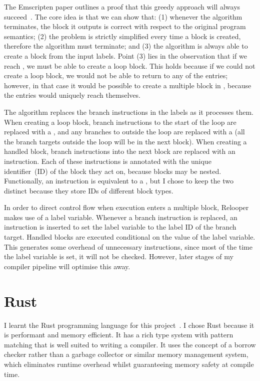 \documentclass[00-main.tex]{subfiles}
\begin{document}
The Emscripten paper outlines a proof that this greedy approach will always succeed~.
The core idea is that we can show that: (1) whenever the algorithm terminates, the block it outputs is correct with respect to the original program semantics; (2) the problem is strictly simplified every time a block is created, therefore the algorithm must terminate; and (3) the algorithm is always able to create a block from the input labels.
Point (3) lies in the observation that if we reach , we must be able to create a loop block.
This holds because if we could not create a loop block, we would not be able to return to any of the entries; however, in that case it would be possible to create a multiple block in , because the entries would uniquely reach themselves.

The algorithm replaces the branch instructions in the labels as it processes them.
When creating a loop block, branch instructions to the start of the loop are replaced with a , and any branches to outside the loop are replaced with a  (all the branch targets outside the loop will be in the next block).
When creating a handled block, branch instructions into the next block are replaced with an  instruction.
Each of these instructions is annotated with the unique identifier~(ID) of the block they act on, because blocks may be nested.
Functionally, an  instruction is equivalent to a , but I chose to keep the two distinct because they store IDs of different block types.

In order to direct control flow when execution enters a multiple block, Relooper makes use of a label variable.
Whenever a branch instruction is replaced, an instruction is inserted to set the label variable to the label ID of the branch target.
Handled blocks are executed conditional on the value of the label variable.
This generates some overhead of unnecessary instructions, since most of the time the label variable is set, it will not be checked.
However, later stages of my compiler pipeline will optimise this away.


\section{Rust}\label{sec:prep:rust}

I learnt the Rust programming language for this project~.
I chose Rust because it is performant and memory efficient.
It has a rich type system with pattern matching that is well suited to writing a compiler.
It uses the concept of a borrow checker rather than a garbage collector or similar memory management system, which eliminates runtime overhead whilst guaranteeing memory safety at compile time.
\end{document}
